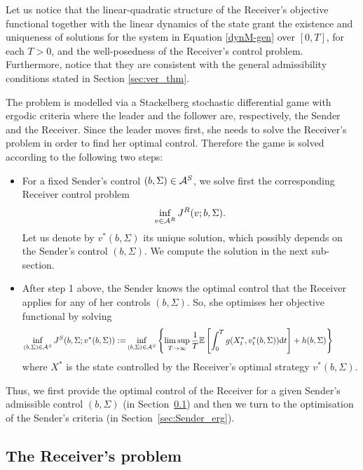 \documentclass[a4paper,10pt]{article}
\newcommand{\EE}{\mathbb{E}}
\newcommand{\D}{\mathrm{d}}
\theoremstyle{definition}
\theoremstyle{plain}
\numberwithin{equation}{section}
\begin{document}
Let us notice that the linear-quadratic structure of the Receiver's objective functional together with the linear dynamics of the state grant the existence and uniqueness of solutions for the system in Equation \eqref{dynM-gen} over $[0,T]$, for each $T>0$, and the well-posedness of  the Receiver's control problem.
Furthermore, notice that they are consistent with the general admissibility conditions stated in Section \ref{sec:ver_thm}.
\medskip

The  problem is modelled via a Stackelberg stochastic differential game with ergodic criteria where the leader and the follower are, respectively, the Sender and the Receiver. Since the leader moves first, she needs to solve the Receiver's problem in order to find her optimal control. Therefore the game is solved according to the following two steps:
\begin{itemize}   
\item[1.] 
    For a fixed Sender's control $(b,\Sigma)\in \mathcal A^{\rm S}$, we solve first the corresponding Receiver control problem
    \[ \inf_{v \in \mathcal A^{\rm R}} J^{\rm R} (v;b,\Sigma). \]
    Let us denote by $v^*(b,\Sigma)$ its unique solution, which possibly depends on the Sender's control $(b,\Sigma)$. We compute the solution in the next sub-section. \medskip
    
\item[2.] 
    After step 1 above, the Sender knows the optimal control that the Receiver applies for any of her controls $(b,\Sigma)$. So, she optimises her objective functional by solving 
    \begin{align}\label{eq:JS}
        \inf_{(b,\Sigma) \in \mathcal A^{\rm S}} J^{\rm S} (b,\Sigma; v^* (b,\Sigma)) := & \inf_{(b , \Sigma)\in \mathcal A^{\rm S}} \left\{ \limsup_{T\to \infty} \frac{1}{T} \EE \left[\int_0^T g(X^*_{t},v^*_t (b,\Sigma)) \D t\right] + h(b, \Sigma)  \right\} 
        \qquad \qquad 
    \end{align}
    where $X^*$ is the state controlled by the Receiver's optimal strategy $v^* (b,\Sigma)$. 
\end{itemize}


 Thus, we first provide the optimal control of the Receiver for a given Sender's admissible control $(b,\Sigma)$ (in Section~\ref{ssec:Receiver_gen}) and then we turn to the optimisation of the Sender's criteria (in Section~\ref{sec:Sender_erg}).


\subsection{The Receiver's problem}\label{ssec:Receiver_gen}
\end{document}
